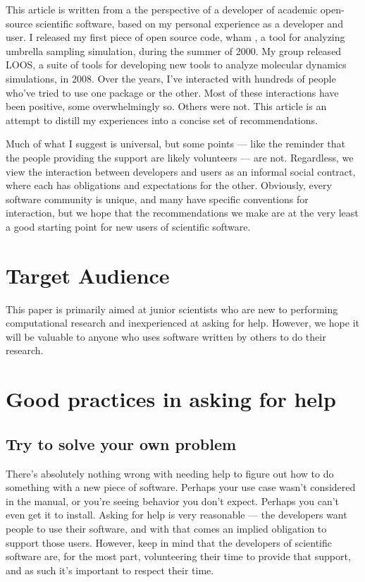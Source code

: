 \documentclass[9pt,training]{livecoms}
\begin{document}
This article is written from a the perspective of a developer of academic
open-source scientific software, based on my personal experience as a developer
and user. I released my first piece of open source code, wham \cite{WHAM}, a
tool for analyzing umbrella sampling simulation,  during the summer of 2000.  My
group released LOOS\cite{Grossfield-2009, LOOS-JCC}, a suite of tools for
developing new tools to analyze molecular dynamics simulations, in 2008. Over
the years, I've interacted with hundreds of people who've tried to use one
package or the other. Most of these interactions have been positive, some
overwhelmingly so. Others were not. This article is an attempt to distill my
experiences into a concise set of recommendations.

Much of what I suggest is universal, but some points --- like the
reminder that the people providing the support are likely volunteers --- are
not.  Regardless, we view the interaction between developers and users as an
informal social contract, where each has obligations and expectations for the
other. Obviously, every software community is unique, and many have specific
conventions for interaction, but we hope that the recommendations we make are at
the very least a good starting point for new users of scientific software.



\section{Target Audience}

This paper is primarily aimed at junior scientists who are new to performing
computational research and inexperienced at asking for help. However, we hope it
will be valuable to anyone who uses software written by others to do their
research.

\section{Good practices in asking for help}

\subsection{Try to solve your own problem}
\label{ss:yourself}

There's absolutely nothing wrong with needing help to figure out how to do
something with a new piece of software. Perhaps your use case wasn't considered
in the manual, or you're seeing behavior you don't expect. Perhaps you can't
even get it to install. Asking for help is very reasonable --- the developers
want people to use their software, and with that comes an implied obligation to
support those users. However, keep in mind that the developers of scientific
software are, for the most part, volunteering their time to provide that
support, and as such it's important to respect their time.
\end{document}
